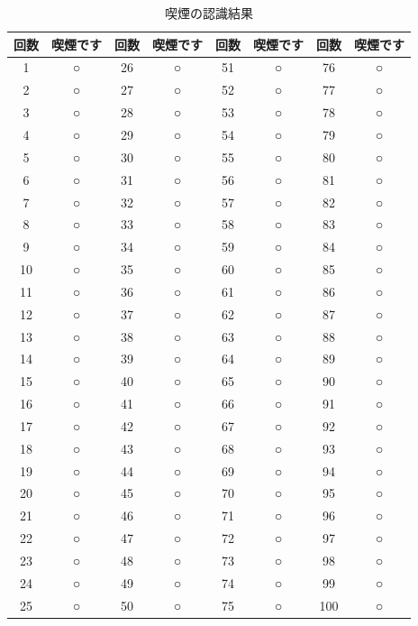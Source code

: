 \documentclass[12pt,oneside]{sotsuken_paper}
\begin{document}
\begin{table}[htb]
\begin{center}
\caption{喫煙の認識結果}
\begin{tabular}{|c|c|c|c|c|c|c|c|}\hline
回数&喫煙です&回数&喫煙です&回数&喫煙です&回数&喫煙です\\\hline
1&○&26&○&51&○&76&○\\\hline
2&○&27&○&52&○&77&○\\\hline
3&○&28&○&53&○&78&○\\\hline
4&○&29&○&54&○&79&○\\\hline
5&○&30&○&55&○&80&○\\\hline
6&○&31&○&56&○&81&○\\\hline
7&○&32&○&57&○&82&○\\\hline
8&○&33&○&58&○&83&○\\\hline
9&○&34&○&59&○&84&○\\\hline
10&○&35&○&60&○&85&○\\\hline
11&○&36&○&61&○&86&○\\\hline
12&○&37&○&62&○&87&○\\\hline
13&○&38&○&63&○&88&○\\\hline
14&○&39&○&64&○&89&○\\\hline
15&○&40&○&65&○&90&○\\\hline
16&○&41&○&66&○&91&○\\\hline
17&○&42&○&67&○&92&○\\\hline
18&○&43&○&68&○&93&○\\\hline
19&○&44&○&69&○&94&○\\\hline
20&○&45&○&70&○&95&○\\\hline
21&○&46&○&71&○&96&○\\\hline
22&○&47&○&72&○&97&○\\\hline
23&○&48&○&73&○&98&○\\\hline
24&○&49&○&74&○&99&○\\\hline
25&○&50&○&75&○&100&○
\\\hline
\end{tabular}
\label{tab:smokrecogresult}
\end{center}
\end{table}
\end{document}
